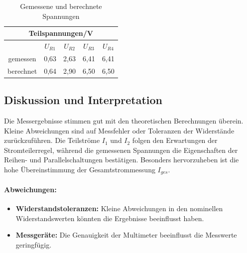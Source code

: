 \begin{table}[H]
    \centering
    \caption{Gemessene und berechnete Spannungen}
    \begin{tabular}{c c c c c}
         \hline 
         \multicolumn{5}{c}{Teilspannungen/\unit{V}} \\
         \hline
        & $U_{R1}$ & $U_{R2}$ & $U_{R3}$ & $U_{R4}$\\
        gemessen & 0,63 & 2,63 & 6,41 & 6,41\\
        berechnet & 0,64 & 2,90 & 6,50 & 6,50\\
         \hline
    \end{tabular}
    \label{tab:K3T2}
\end{table}

\subsection{Diskussion und Interpretation}
Die Messergebnisse stimmen gut mit den theoretischen Berechnungen überein. Kleine Abweichungen sind auf Messfehler oder Toleranzen der Widerstände zurückzuführen. Die Teilströme \(I_1\) und \(I_2\) folgen den Erwartungen der Stromteilerregel, während die gemessenen Spannungen die Eigenschaften der Reihen- und Parallelschaltungen bestätigen. Besonders hervorzuheben ist die hohe Übereinstimmung der Gesamtstrommessung \(I_{ges}\).

\paragraph{Abweichungen:}
\begin{itemize}
    \item \textbf{Widerstandstoleranzen:} Kleine Abweichungen in den nominellen Widerstandswerten könnten die Ergebnisse beeinflusst haben.
    \item \textbf{Messgeräte:} Die Genauigkeit der Multimeter beeinflusst die Messwerte geringfügig.
\end{itemize}

\newpage